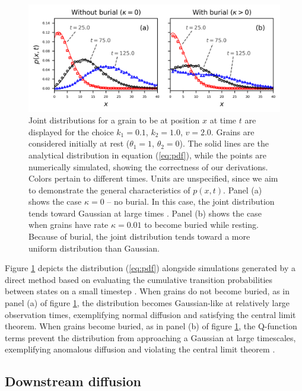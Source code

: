 \begin{figure}[!htbp]
	\includegraphics[width=\linewidth,keepaspectratio]{./figures/ch4/pdf-plot.png}
	\caption{Joint distributions for a grain to be at position $x$ at time $t$ are displayed for the choice $k_1=0.1$, $k_2=1.0$, $v=2.0$. Grains are considered initially at rest ($\theta_1=1$, $\theta_2=0$). The solid lines are the analytical distribution in equation (\ref{eq:pdf}), while the points are numerically simulated, showing the correctness of our derivations. Colors pertain to different times. Units are unspecified, since we aim to demonstrate the general characteristics of $p(x,t)$. Panel (a) shows the case $\kappa=0$ -- no burial. In this case, the joint distribution tends toward Gaussian at large times \citep{Einstein1937,Lisle1998}. Panel (b) shows the case when grains have rate $\kappa = 0.01$ to become buried while resting. Because of burial, the joint distribution tends toward a more uniform distribution than Gaussian.
		\label{fig:pdfs}}
\end{figure}

Figure \ref{fig:pdfs} depicts the distribution (\ref{eq:pdf}) alongside simulations generated by a direct method based on evaluating the cumulative transition probabilities between states on a small timestep \citep{Barik2006}.
When grains do not become buried, as in panel (a) of figure \ref{fig:pdfs}, the distribution becomes Gaussian-like at relatively large observation times, exemplifying normal diffusion and satisfying the central limit theorem.
When grains become buried, as in panel (b) of figure \ref{fig:pdfs},  the Q-function terms prevent the distribution from approaching a Gaussian at large timescales, exemplifying anomalous diffusion \citep{Weeks1998} and violating the central limit theorem \citep{Metzler2000,Schumer2009}.


\subsection{Downstream diffusion}

